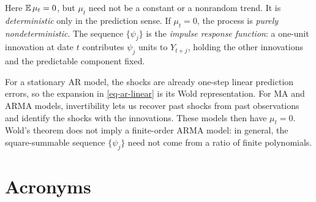 \documentclass[a4paper,12pt]{article}
\begin{document}
\begin{remark}
	Here $\operatorname{\mathbb{E}}\mu_t=0$, but $\mu_t$ need not be a constant or a nonrandom trend.
	It is \emph{deterministic} only in the prediction sense.
	If $\mu_t=0$, the process is \emph{purely nondeterministic}.
	The sequence $\{\psi_j\}$ is the \emph{impulse response function}:
	a one-unit innovation at date $t$ contributes $\psi_j$ units to $Y_{t+j}$,
	holding the other innovations and the predictable component fixed.
\end{remark}

\begin{remark}
	For a stationary AR model, the shocks are already one-step linear prediction errors,
	so the expansion in \eqref{eq-ar-linear} is its Wold representation.
	For MA and ARMA models, invertibility lets us recover past shocks from past observations
	and identify the shocks with the innovations.
	These models then have $\mu_t=0$.
	Wold's theorem does not imply a finite-order ARMA model:
	in general, the square-summable sequence $\{\psi_j\}$ need not come from a ratio of finite polynomials.
\end{remark}

\vfill
\section*{Acronyms}
\printglossaries
\end{document}
